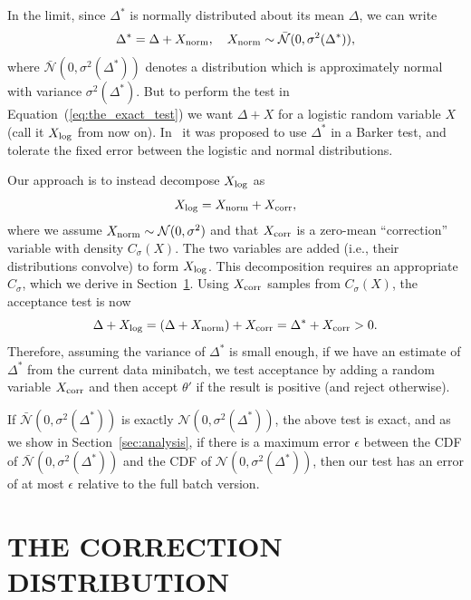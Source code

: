 \documentclass[letterpaper]{article}
\begin{document}
In the limit, since $\Delta^*$ is normally distributed about its mean $\Delta$,
we can write
\begin{equation}\label{eq:relationship}
    \Delta^* = \Delta + X_{\rm norm}, \quad X_{\rm norm} \sim \mathcal{\bar{N}}(0, \sigma^2(\Delta^*)),
\end{equation}
where $\mathcal{\bar{N}}(0, \sigma^2(\Delta^*))$ denotes a distribution which is
approximately normal with variance $\sigma^2(\Delta^*)$.  But to perform the
test in Equation~(\ref{eq:the_exact_test}) we want $\Delta + X$ for a logistic
random variable $X$ (call it $X_{\rm log}$ from now on). In~\citep{TallData16} it
was proposed to use $\Delta^*$ in a Barker test, and tolerate the fixed
error between the logistic and normal distributions. 

Our approach is to instead decompose $X_{\rm log}$ as
\begin{equation}\label{eq:deconvolution}
    X_{\rm log} = X_{\rm norm}+X_{\rm corr},
\end{equation}
where we assume $X_{\rm norm} \sim \mathcal{N}(0, \sigma^2)$ and that $X_{\rm
corr}$ is a zero-mean ``correction'' variable with density $C_{\sigma}(X)$.  The
two variables are added (i.e., their distributions convolve) to form $X_{\rm
log}$.  This decomposition requires an appropriate $C_\sigma$, which we derive
in Section~\ref{sec:correction}. Using $X_{\rm corr}$ samples from
$C_{\sigma}(X)$, the acceptance test is now
\begin{equation}\label{eq:criteria}
    \Delta + X_{\rm log} = (\Delta + X_{\rm norm}) + X_{\rm corr} = \Delta^* + X_{\rm corr} >0.
\end{equation}
Therefore, assuming the variance of $\Delta^*$ is small enough, if we have an
estimate of $\Delta^*$ from the current data minibatch, we test acceptance by
adding a random variable $X_{\rm corr}$ and then accept $\theta'$ if the result
is positive (and reject otherwise).

If $\mathcal{\bar{N}}(0, \sigma^2(\Delta^*))$ is exactly $\mathcal{N}(0,
\sigma^2(\Delta^*))$, the above test is exact, and as we show in
Section~\ref{sec:analysis}, if there is a maximum error $\epsilon$ between the
CDF of $\mathcal{\bar{N}}(0, \sigma^2(\Delta^*))$ and the CDF of $\mathcal{N}(0,
\sigma^2(\Delta^*))$, then our test has an error of at most $\epsilon$ relative
to the full batch version.




\section{THE CORRECTION DISTRIBUTION}\label{sec:correction}
\end{document}
